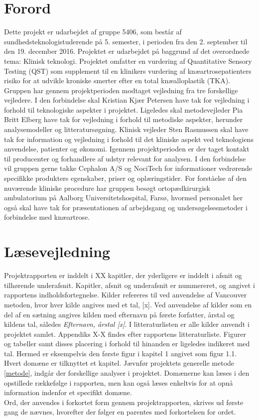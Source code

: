 \section{Forord}
Dette projekt er udarbejdet af gruppe 5406, som består af sundhedsteknologistuderende på 5. semester, i perioden fra den 2. september til den 19. december 2016. Projektet er udarbejdet på baggrund af det overordnede tema: Klinisk teknologi. Projektet omfatter en vurdering af Quantitative Sensory Testing (QST) som supplement til en klinikers vurdering af knæartrosepatienters risiko for at udvikle kroniske smerter efter en total knæalloplastik (TKA). Gruppen har gennem projektperioden modtaget vejledning fra tre forskellige vejledere. I den forbindelse skal Kristian Kjær Petersen have tak for vejledning i forhold til teknologiske aspekter i projektet. Ligeledes skal metodevejleder Pia Britt Elberg have tak for vejledning i forhold til metodiske aspekter, herunder analysemodeller og litteratursøgning. Klinisk vejleder Sten Rasmussen skal have tak for information og vejledning i forhold til det kliniske aspekt ved teknologiens anvendelse, patienter og økonomi. Igennem projektperioden er der taget kontakt til producenter og forhandlere af udstyr relevant for analysen. I den forbindelse vil gruppen gerne takke Cephalon A/S og NociTech for informationer vedrørende specifikke produkters egenskaber, priser og oplæringstider. For forståelse af den nuværende kliniske procedure har gruppen besøgt ortopædkirurgisk ambulatorium på Aalborg Universitetshospital, Farsø, hvormed personalet her også skal have tak for præsentationen af arbejdsgang og undersøgelsesmetoder i forbindelse med knæartrose.


\section{Læsevejledning}
Projektrapporten er inddelt i XX kapitler, der yderligere er inddelt i afsnit og tilhørende underafsnit. Kapitler, afsnit og underafsnit er nummereret, og angivet i rapportens indholdsfortegnelse. Kilder refereres til ved anvendelse af Vancouver metoden, hvor hver kilde angives med et tal, [x]. Ved anvendelse af kilder som en del af en sætning angives kilden med efternavn på første forfatter, årstal og kildens tal, således \textit{Efternavn, årstal [x]}. I litteraturlisten er alle kilder anvendt i projektet samlet. Appendiks X-X findes efter rapportens litteraturliste.
Figurer og tabeller samt disses placering i forhold til hinanden er ligeledes indikeret med tal. Hermed er eksempelvis den første figur i kapitel 1 angivet som figur 1.1. Hvert domæne er tilknyttet et kapitel. Jævnfør projektets generelle metode \ref{metode}, indgår der forskellige analyser i projektet. Domænerne kan læses i den opstillede rækkefølge i rapporten, men kan også læses enkeltvis for at opnå information indenfor et specifikt domæne.\\
Ord, der anvendes i forkortet form gennem projektrapporten, skrives ud første gang de nævnes, hvorefter der følger en parentes med forkortelsen for ordet.